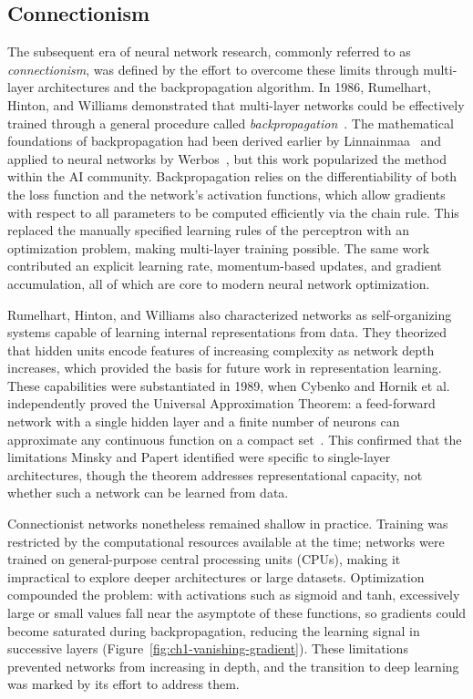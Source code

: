 \subsection{Connectionism}\label{sec:ch1-connectionism}
The subsequent era of neural network research, commonly referred to as \textit{connectionism}, was defined by the effort to overcome these limits through multi-layer architectures and the backpropagation algorithm. In 1986, Rumelhart, Hinton, and Williams demonstrated that multi-layer networks could be effectively trained through a general procedure called \textit{backpropagation}~\cite{rumelhart1986learning}. The mathematical foundations of backpropagation had been derived earlier by Linnainmaa~\cite{linnainmaa1970representation} and applied to neural networks by Werbos~\cite{werbos2005applications}, but this work popularized the method within the AI community. Backpropagation relies on the differentiability of both the loss function and the network's activation functions, which allow gradients with respect to all parameters to be computed efficiently via the chain rule. This replaced the manually specified learning rules of the perceptron with an optimization problem, making multi-layer training possible. The same work contributed an explicit learning rate, momentum-based updates, and gradient accumulation, all of which are core to modern neural network optimization.

Rumelhart, Hinton, and Williams also characterized networks as self-organizing systems capable of learning internal representations from data. They theorized that hidden units encode features of increasing complexity as network depth increases, which provided the basis for future work in representation learning. These capabilities were substantiated in 1989, when Cybenko and Hornik et al. independently proved the Universal Approximation Theorem: a feed-forward network with a single hidden layer and a finite number of neurons can approximate any continuous function on a compact set~\cite{cybenko1989approximation, hornik1989multilayer}. This confirmed that the limitations Minsky and Papert identified were specific to single-layer architectures, though the theorem addresses representational capacity, not whether such a network can be learned from data.

Connectionist networks nonetheless remained shallow in practice. Training was restricted by the computational resources available at the time; networks were trained on general-purpose central processing units (CPUs), making it impractical to explore deeper architectures or large datasets. Optimization compounded the problem: with activations such as sigmoid and tanh, excessively large or small values fall near the asymptote of these functions, so gradients could become saturated during backpropagation, reducing the learning signal in successive layers (Figure~\ref{fig:ch1-vanishing-gradient}). These limitations prevented networks from increasing in depth, and the transition to deep learning was marked by its effort to address them.

